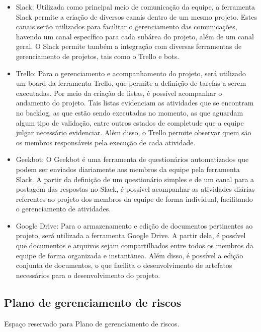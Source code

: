 \begin{itemize}
	\item Slack: Utilizada como principal meio de comunicação da equipe, a ferramenta Slack permite a criação de diversos canais dentro de um mesmo projeto. Estes canais serão utilizados para facilitar o gerenciamento das comunicações, havendo um canal específico para cada subárea do projeto, além de um canal geral. O Slack permite também a integração com diversas ferramentas de gerenciamento de projetos, tais como o Trello e bots.
	
	\item Trello: Para o gerenciamento e acompanhamento do projeto, será utilizado um board da ferramenta Trello, que permite a definição de tarefas a serem executadas. Por meio da criação de listas, é possível acompanhar o andamento do projeto. Tais listas evidenciam as atividades que se encontram no backlog, as que estão sendo executadas no momento, as que aguardam algum tipo de validação, entre outros estados de completude que a equipe julgar necessário evidenciar. Além disso, o Trello permite observar quem são os membros responsáveis pela execução de cada atividade.
	
	\item Geekbot: O Geekbot é uma ferramenta de questionários automatizados que podem ser enviados diariamente aos membros da equipe pela ferramenta Slack. A partir da definição de um questionário simples e de um canal para a postagem das respostas no Slack, é possível acompanhar as atividades diárias referentes ao projeto dos membros da equipe de forma individual, facilitando o gerenciamento de atividades. 
	
	\item Google Drive: Para o armazenamento e edição de documentos pertinentes ao projeto, será utilizada a ferramenta Google Drive. A partir dela, é possível que documentos e arquivos sejam compartilhados entre todos os membros da equipe de forma organizada e instantânea. Além disso, é possível a edição conjunta de documentos, o que facilita o desenvolvimento de artefatos necessários para o desenvolvimento do projeto.
	
\end{itemize}

\subsection{Plano de gerenciamento de riscos}

Espaço reservado para Plano de gerenciamento de riscos.

